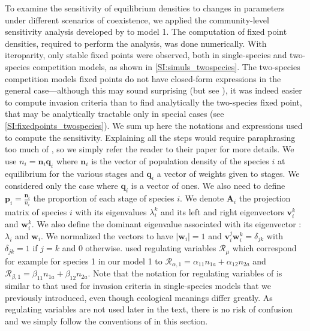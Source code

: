 \documentclass{article}
\begin{document}
To examine the sensitivity of equilibrium densities to changes in parameters under different scenarios of coexistence, we applied the community-level sensitivity analysis developed by \citet{barabas2014fixed} to model 1. The computation of fixed point densities, required to perform the analysis, was done numerically.  With iteroparity, only stable fixed points were observed, both in single-species and two-species competition models, as shown in \ref{SI:simuls_twospecies}. The two-species competition models fixed points do not have closed-form expressions in the general case---although this may sound surprising (but see \citealt{meszena1997adaptive}), it was indeed easier to compute invasion criteria than to find analytically the two-species fixed point, that may be analytically tractable only in special cases (see \ref{SI:fixedpoints_twospecies}). We sum up here the notations and expressions used to compute the sensitivity. Explaining all the steps would require paraphrasing too much of \citet{barabas2014fixed}, so we simply refer the reader to their paper for more details.
We use $n_i = \mathbf{n}_i\mathbf{q}_i$ where $\mathbf{n}_i$ is the vector of population density of the species $i$ at equilibrium for the various stages and $\mathbf{q}_i$ a vector of weights given to stages. We considered only the case where $\mathbf{q}_i$ is a vector of ones. We also need to define $\mathbf{p}_i = \frac{\mathbf{n}_i}{n_i}$ the proportion of each stage of species $i$.
We denote $\mathbf{A}_i$ the projection matrix of species $i$ with its eigenvalues $\lambda^k_i$ and its left and right eigenvectors $\mathbf{v}_i^k$ and $\mathbf{w}_i^k$. We also define the dominant eigenvalue associated with its eigenvector : $\lambda_i$ and $\mathbf{w}_i$. We normalized the vectors to have $|\mathbf{w}_i|=1$ and $\mathbf{v}_i^j \mathbf{w}_i^k = \delta_{jk}$ with $\delta_{jk} = 1$ if $j=k$ and $0$ otherwise.
\citet{barabas2014fixed} used regulating variables $\mathcal{R}_\mu$ which correspond for example for species 1 in our model 1 to $\mathcal{R}_{\alpha,1} = \alpha_{11}n_{1a} + \alpha_{12}n_{2a}$ and $\mathcal{R}_{\beta,1} = \beta_{11}n_{1a} + \beta_{12}n_{2a}$. Note that the notation for regulating variables of \citet{barabas2014fixed} is similar to that used for invasion criteria in single-species models that we previously introduced, even though ecological meanings differ greatly. As regulating variables are not used later in the text, there is no risk of confusion and we simply follow the conventions of \citet{barabas2014fixed} in this section.
\end{document}
